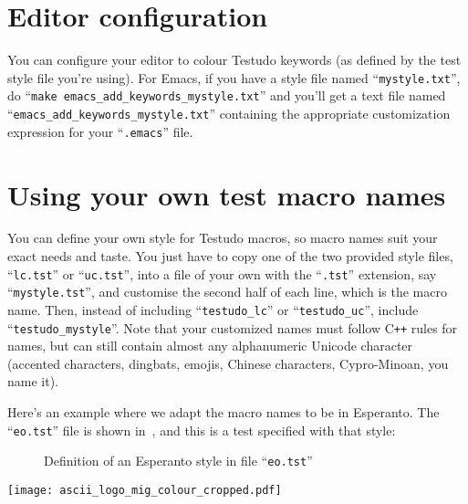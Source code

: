 \documentclass[twoside, a4paper, article]{memoir}
\providecommand\typesetexample[1]{%
}
\newcommand*\Cpp{C\texttt{++}}
\begin{document}
\chapter{Editor configuration}
\label{cha:editor-configuration}

You can configure your editor to colour Testudo keywords (as defined by the
test style file you're using).  For Emacs, if you have a style file named
``\texttt{mystyle.txt}'', do ``\texttt{make
  emacs\_add\_keywords\_mystyle.txt}'' and you'll get a text file named
``\texttt{emacs\_add\_keywords\_mystyle.txt}'' containing the appropriate
customization expression for your ``\texttt{.emacs}'' file.


\chapter{Using your own test macro names}
\label{cha:using-your-own-test-macro-names}

You can define your own style for Testudo macros, so macro names suit your
exact needs and taste.  You just have to copy one of the two provided style
files, ``\texttt{lc.tst}'' or ``\texttt{uc.tst}'', into a file of your own with
the ``\texttt{.tst}'' extension, say ``\texttt{mystyle.tst}'', and customise
the second half of each line, which is the macro name.  Then, instead of
including ``\texttt{testudo\_lc}'' or ``\texttt{testudo\_uc}'', include
``\texttt{testudo\_mystyle}''.  Note that your customized names must follow
\Cpp{} rules for names, but can still contain almost any alphanumeric Unicode
character (accented characters, dingbats, emojis, Chinese characters,
Cypro-Minoan, you name it).

Here's an example where we adapt the macro names to be in Esperanto.  The
``\texttt{eo.tst}'' file is shown in~, and this is a
test specified with that style:

\typesetexample{esperanto}

\begin{figure}
  \centering
  \caption{Definition of an Esperanto style in file ``\texttt{eo.tst}''}
  \label{fig:esperanto-style}
\end{figure}

\backmatter

\cleartoevenpage

\thispagestyle{empty}

\vspace*{\fill}

\begin{center}
\texttt{[image: ascii\_logo\_mig\_colour\_cropped.pdf]}
\end{center}
\end{document}
